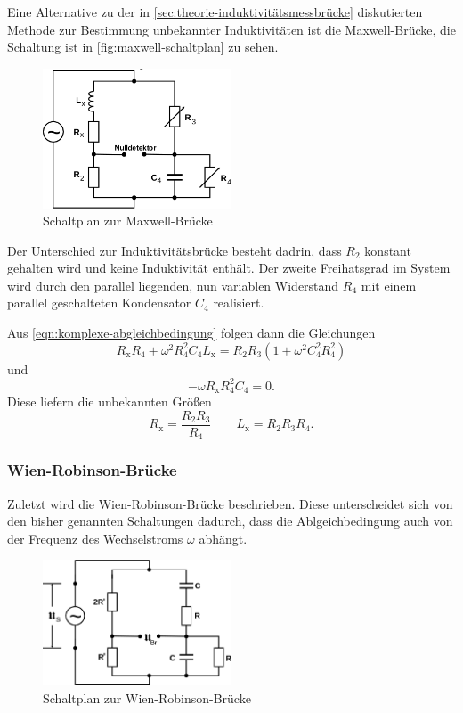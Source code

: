 Eine Alternative zu der in \autoref{sec:theorie-induktivitätsmessbrücke} diskutierten Methode zur
Bestimmung unbekannter Induktivitäten ist die Maxwell-Brücke, die Schaltung ist in 
\autoref{fig:maxwell-schaltplan} zu sehen.
\begin{figure}[H]
	\centering
	\includegraphics[width=0.5\textwidth]{bilder/maxwellbruecke.png}
	\caption{Schaltplan zur Maxwell-Brücke \cite{sample}}
	\label{fig:maxwell-schaltplan}
\end{figure}

Der Unterschied zur Induktivitätsbrücke besteht dadrin, dass $R_2$ konstant gehalten wird und keine 
Induktivität enthält. Der zweite Freihatsgrad im System wird durch den parallel liegenden, nun
variablen Widerstand $R_4$ mit einem parallel geschalteten Kondensator $C_4$ realisiert.

Aus \autoref{eqn:komplexe-abgleichbedingung} folgen dann die Gleichungen
\begin{equation}
	R_\text{x} R_4 + \omega^2 R_4^2 C_4 L_\text{x} = R_2 R_3 \left(1 + \omega^2 C_4^2 R_4^2 \right)
	\label{eqn:maxwell-gleichung1}
\end{equation}
und
\begin{equation}
	-\omega R_\text{x} R_4^2 C_4 = 0.
	\label{eqn:maxwell-gleichung2}
\end{equation}
Diese liefern die unbekannten Größen
\begin{equation}
	R_\text{x} = \frac{R_2 R_3}{R_4}
	\qquad
	L_\text{x} = R_2 R_3 R_4.
	\label{eqn:kenngroessen-maxwell}
\end{equation}

\subsubsection{Wien-Robinson-Brücke}
\label{sec:theorie-wien-robinson-bruecke}
Zuletzt wird  die Wien-Robinson-Brücke beschrieben. Diese unterscheidet sich von den 
bisher genannten Schaltungen dadurch, dass die Ablgeichbedingung auch von der Frequenz des Wechselstroms $\omega$
abhängt.
\begin{figure}[H]
	\centering
	\includegraphics[width=0.5\textwidth]{bilder/wien-robinson.png}
	\caption{Schaltplan zur Wien-Robinson-Brücke \cite{sample}}
	\label{fig:wien-robinson-schaltplan}
\end{figure}

